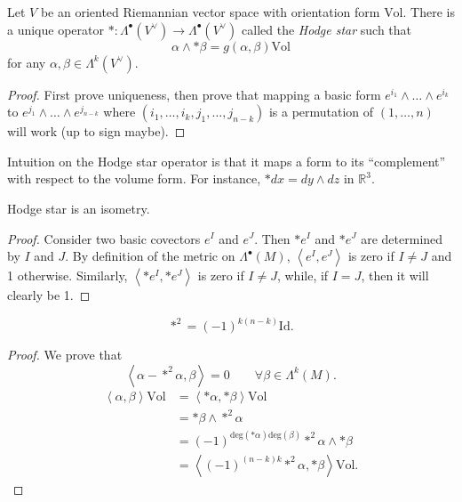 \begin{exercise}
\label{exercise-hodge-star-existence}
Let $V$ be an oriented Riemannian vector space with
orientation form $\text{Vol}$.
There is a unique operator 
$*:\Lambda^\bullet(V^\vee) \to \Lambda^\bullet(V^\vee)$
called the {\it Hodge star} such that
$$
\alpha\wedge*\beta=g(\alpha,\beta)\text{Vol}
$$
for any $\alpha,\beta \in \Lambda^k(V^\vee)$.
\end{exercise}

\begin{proof}
First prove uniqueness,
then prove that mapping a basic form $e^{i_1}\wedge… \wedge e^{i_k}$
to $e^{j_1}\wedge…\wedge e^{j_{n-k}}$
where $(i_1,…,i_k,j_1,…,j_{n-k})$ is a permutation of
$(1,…,n)$ will work (up to sign maybe).
\end{proof}

\noindent
Intuition on the Hodge star operator is that
it maps a form to its ``complement'' with respect to the volume form.
For instance, $*dx=dy \wedge dz$ in $\mathbb{R}^3$.

\begin{lemma}
\label{lemma-hodge-star-isometry}
Hodge star is an isometry.
\end{lemma}

\begin{proof}
Consider two basic covectors $e^I$ and $e^J$.
Then $*e^I$ and $*e^J$ are determined by $I$ and $J$.
By definition of the metric on $\Lambda^\bullet(M)$,
$\left<e^I,e^J\right>$ is zero if $I\neq J$ and 1 otherwise.
Similarly, $\left<*e^I,*e^J\right>$ is zero if $I\neq J$,
while, if $I=J$, then it will clearly be 1.
\end{proof}

\begin{lemma}
\label{lemma-hodge-star-squared}
\begin{reference}
\cite[Lemma 5.5]{Voisin}
\end{reference}
$$
*^2=(-1)^{k(n-k)}\text{Id}.
$$
\end{lemma}

\begin{proof}
We prove that
$$
\left<\alpha-*^2\alpha,\beta\right>=0\qquad 
\forall \beta \in \Lambda^k(M).
$$
\begin{align*}
\left<\alpha,\beta\right>\text{Vol}
&=\left<*\alpha,*\beta\right>\text{Vol}\\
&=*\beta\wedge *^2\alpha\\
&=(-1)^{\text{deg}(*\alpha) \text{deg}(\beta)}*^2\alpha\wedge *\beta\\
&=\left<(-1)^{(n-k)k}*^2\alpha,*\beta\right>\text{Vol}.
\end{align*}
\end{proof}

